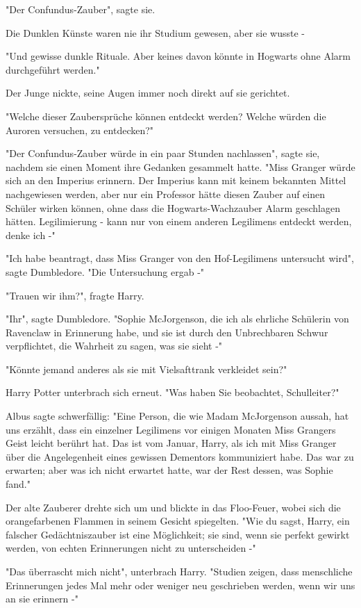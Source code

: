 {"Der Confundus-Zauber", sagte sie.

Die Dunklen Künste waren nie ihr Studium gewesen, aber sie wusste -

"Und gewisse dunkle Rituale. Aber keines davon könnte in Hogwarts ohne Alarm durchgeführt werden."

Der Junge nickte, seine Augen immer noch direkt auf sie gerichtet.

"Welche dieser Zaubersprüche können entdeckt werden? Welche würden die Auroren versuchen, zu entdecken?"

"Der Confundus-Zauber würde in ein paar Stunden nachlassen", sagte sie, nachdem sie einen Moment ihre Gedanken gesammelt hatte. "Miss Granger würde sich an den Imperius erinnern. Der Imperius kann mit keinem bekannten Mittel nachgewiesen werden, aber nur ein Professor hätte diesen Zauber auf einen Schüler wirken können, ohne dass die Hogwarts-Wachzauber Alarm geschlagen hätten. Legilimierung - kann nur von einem anderen Legilimens entdeckt werden, denke ich -"

"Ich habe beantragt, dass Miss Granger von den Hof-Legilimens untersucht wird", sagte Dumbledore. "Die Untersuchung ergab -"

"Trauen wir ihm?", fragte Harry.

"Ihr", sagte Dumbledore. "Sophie McJorgenson, die ich als ehrliche Schülerin von Ravenclaw in Erinnerung habe, und sie ist durch den Unbrechbaren Schwur verpflichtet, die Wahrheit zu sagen, was sie sieht -"

"Könnte jemand anderes als sie mit Vielsafttrank verkleidet sein?"

Harry Potter unterbrach sich erneut. "Was haben Sie beobachtet, Schulleiter?"

Albus sagte schwerfällig: "Eine Person, die wie Madam McJorgenson aussah, hat uns erzählt, dass ein einzelner Legilimens vor einigen Monaten Miss Grangers Geist leicht berührt hat. Das ist vom Januar, Harry, als ich mit Miss Granger über die Angelegenheit eines gewissen Dementors kommuniziert habe. Das war zu erwarten; aber was ich nicht erwartet hatte, war der Rest dessen, was Sophie fand."

Der alte Zauberer drehte sich um und blickte in das Floo-Feuer, wobei sich die orangefarbenen Flammen in seinem Gesicht spiegelten. "Wie du sagst, Harry, ein falscher Gedächtniszauber ist eine Möglichkeit; sie sind, wenn sie perfekt gewirkt werden, von echten Erinnerungen nicht zu unterscheiden -"

"Das überrascht mich nicht", unterbrach Harry. "Studien zeigen, dass menschliche Erinnerungen jedes Mal mehr oder weniger neu geschrieben werden, wenn wir uns an sie erinnern -"

}

